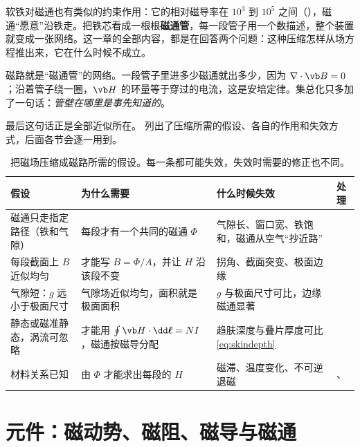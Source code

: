 软铁对磁通也有类似的约束作用：它的相对磁导率在 $10^3$ 到 $10^5$ 之间（），磁通“愿意”沿铁走。把铁芯看成一根根\textbf{磁通管}，每一段管子用一个数描述，整个装置就变成一张网络。这一章的全部内容，都是在回答两个问题：这种压缩怎样从场方程推出来，它在什么时候不成立。

\begin{intuition}[磁通管]
磁路就是“磁通管”的网络。一段管子里进多少磁通就出多少，因为 $\nabla\cdot\vb B=0$；沿着管子绕一圈，$\vb H$ 的环量等于穿过的电流，这是安培定律。集总化只多加了一句话：\emph{管壁在哪里是事先知道的}。
\end{intuition}

最后这句话正是全部近似所在。 列出了压缩所需的假设、各自的作用和失效方式，后面各节会逐一用到。

\begin{table}[htbp]\centering\small
\caption{把磁场压缩成磁路所需的假设。每一条都可能失效，失效时需要的修正也不同。}\label{tab:lumped-assumptions}
\begin{tabularx}{\linewidth}{@{}>{\raggedright\arraybackslash}p{.24\linewidth} Y Y >{\raggedright\arraybackslash}p{.13\linewidth}@{}}
\toprule
假设 & 为什么需要 & 什么时候失效 & 处理\\\midrule
磁通只走指定路径（铁和气隙） & 每段才有一个共同的磁通 $\Phi$ & 气隙长、窗口宽、铁饱和，磁通从空气“抄近路” & \\
每段截面上 $B$ 近似均匀 & 才能写 $B=\Phi/A$，并让 $H$ 沿该段不变 & 拐角、截面突变、极面边缘 & \\
气隙短：$g$ 远小于极面尺寸 & 气隙场近似均匀，面积就是极面面积 & $g$ 与极面尺寸可比，边缘磁通显著 & \\
静态或磁准静态，涡流可忽略 & 才能用 $\oint\vb H\cdot\dd\boldsymbol\ell=NI$，磁通按磁导分配 & 趋肤深度与叠片厚度可比 \eqref{eq:skindepth} & \\
材料关系已知 & 由 $\Phi$ 才能求出每段的 $H$ & 磁滞、温度变化、不可逆退磁 & 、\\
\bottomrule
\end{tabularx}
\end{table}

\section{元件：磁动势、磁阻、磁导与磁通}\label{sec:lumped-elements}

